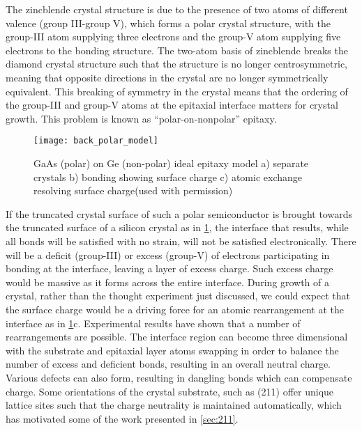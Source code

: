 The zincblende crystal structure is due to the presence of two atoms of different valence (group III-group V), which forms a polar crystal structure, with the group-III atom supplying three electrons and the group-V atom supplying five electrons to the bonding structure. The two-atom basis of zincblende breaks the diamond crystal structure such that the structure is no longer centrosymmetric, meaning that opposite directions in the crystal are no longer symmetrically equivalent. This breaking of symmetry in the crystal means that the ordering of the group-III and group-V atoms at the epitaxial interface matters for crystal growth. This problem is known as ``polar-on-nonpolar'' epitaxy\cite{Biegelsen1992,Kroemer1987}.
\begin{figure}
    \centering
    \texttt{[image: back\_polar\_model]}
    \caption[Atomic model of polar on non-polar epitaxy]{\label{fig:back_polar_model}GaAs (polar) on Ge (non-polar) ideal epitaxy model a) separate crystals b) bonding showing surface charge c) atomic exchange resolving surface charge\cite{Biegelsen1992}(used with permission)}
\end{figure}

If the truncated crystal surface of such a polar semiconductor is brought towards the truncated surface of a silicon crystal as in \cref{fig:back_polar_model}, the interface that results, while all bonds will be satisfied with no strain, will not be satisfied electronically. There will be a deficit (group-III) or excess (group-V) of electrons participating in bonding at the interface, leaving a layer of excess charge. Such excess charge would be massive as it forms across the entire interface. During growth of a crystal, rather than the thought experiment just discussed, we could expect that the surface charge would be a driving force for an atomic rearrangement at the interface as in \cref{fig:back_polar_model}c. Experimental results have shown that a number of rearrangements are possible. The interface region can become three dimensional with the substrate and epitaxial layer atoms swapping in order to balance the number of excess and deficient bonds, resulting in an overall neutral charge. Various defects can also form, resulting in dangling bonds which can compensate charge. Some orientations of the crystal substrate, such as (211) offer unique lattice sites such that the charge neutrality is maintained automatically, which has motivated some of the work presented in \cref{sec:211}.

